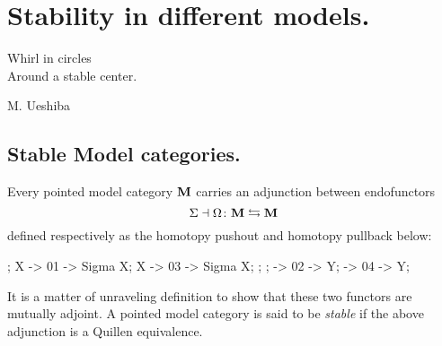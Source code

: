 \section{Stability in different models.}\label{model.stable}
\epigraph{Whirl in circles\\ Around a stable center.}{M\@. Ueshiba}
\subsection{Stable Model categories.}
Every pointed model category \cite[\achap \textbf{7}]{Hov} $\mathbf{M}$ carries an adjunction between endofunctors
\[
\Sigma \dashv \Omega \colon \mathbf{M} \leftrightarrows \mathbf{M}
\]
defined respectively as the homotopy pushout and homotopy pullback below:
\begin{center}
\begin{kD}
;
\mor X -> 01 -> {Sigma X};
\mor X -> 03 -> {Sigma X};
;
;
 -> 02 -> Y;
 -> 04 -> Y;
\end{kD}
\end{center}
It is a matter of unraveling definition to show that these two functors are mutually adjoint. A pointed model category is said to be \emph{stable} if the above adjunction is a Quillen equivalence.
